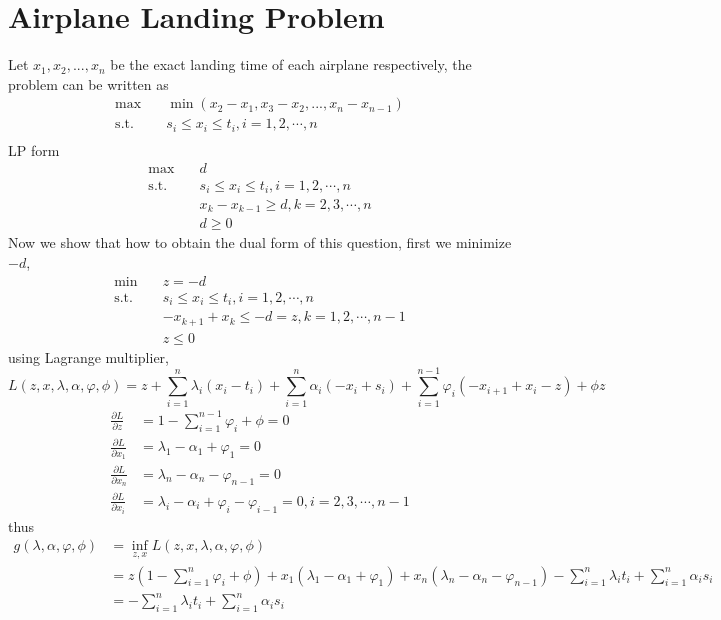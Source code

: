 \section{Airplane Landing Problem}
 Let $x_1, x_2,...,x_n $ be the exact landing time of each airplane respectively, the problem can be written as 
 \[	\begin{split} 
	 \max  \quad &\min(x_2 - x_1, x_3 - x_2, ..., x_n - x_{n-1}) \\
	\text{s.t.} \quad & s_i \leq x_i \leq t_i, i = 1,2,\cdots, n\\
	\end{split}  
 \]
 LP form
 \[
	\begin{split} 
	\max  \quad &d \\
	\text{s.t.} \quad & s_i \leq x_i \leq t_i, i = 1,2,\cdots, n\\
	& x_k - x_{k-1} \geq d, k = 2,3,\cdots, n \\
	&d \geq 0
	\end{split}  
 \]
 Now we show that how to obtain the dual form of this question,
 first we minimize $-d$,
 \[
	 \begin{split} 
	 \min  \quad &z = -d \\
	 \text{s.t.} \quad & s_i \leq x_i \leq t_i, i = 1,2,\cdots, n\\
	 & -x_{k+1} + x_{k} \leq -d = z, k = 1,2,\cdots, n-1 \\
	 &z \leq 0
	 \end{split}  
 \]
 using Lagrange multiplier, 
 \[
	 L(z, x, \lambda, \alpha, \varphi,\phi) = 
	 z + \sum_{i=1}^{n} \lambda_i (x_i - t_i) + 
	 \sum_{i=1}^{n} \alpha_i (-x_i + s_i) + 
	 \sum_{i=1}^{n-1} \varphi_i (-x_{i+1} + x_i - z) + \phi z
 \]
 \[
	\begin{split}  
	 \frac{\partial L}{\partial z} &= 1 - \sum_{i=1}^{n-1} \varphi_i + \phi = 0 \\
	 \frac{\partial L}{\partial x_1} &= \lambda_1 - \alpha_1 + \varphi_1 = 0  \\
	 \frac{\partial L}{\partial x_n} &= \lambda_n - \alpha_n - \varphi_{n-1} = 0 \\
	 \frac{\partial L}{\partial x_i} &= \lambda_i - \alpha_i + \varphi_i - \varphi_{i-1} = 0, i = 2,3,\cdots, n-1 
	 \end{split} 
 \]
 thus
 \[ \begin{split} 
	 g(\lambda,\alpha,\varphi, \phi) &= \inf_{z,x} L(z,x,\lambda, \alpha, \varphi, \phi)  \\ 
	 &= z(1 - \sum_{i=1}^{n}\varphi_i+ \phi)  + x_1(\lambda_1 - \alpha_1 + \varphi_1) + x_n(\lambda_n - \alpha_n - \varphi_{n-1})
	 - \sum_{i=1}^{n}\lambda_i t_i + \sum_{i=1}^{n} \alpha_i s_i \\
	 &= - \sum_{i=1}^{n}\lambda_i t_i + \sum_{i=1}^{n} \alpha_i s_i
	 \end{split}
 \]
